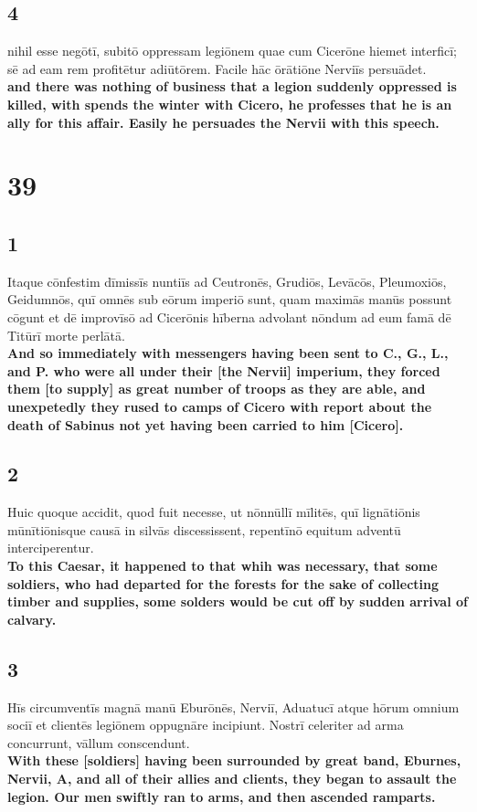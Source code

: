 \documentclass{article}
\begin{document}
\subsection*{4}
nihil esse negōtī, subitō oppressam legiōnem quae cum Cicerōne hiemet interficī; sē ad eam rem profitētur adiūtōrem. Facile hāc ōrātiōne Nerviīs persuādet.\\
\textbf{and there was nothing of business that a legion suddenly oppressed is killed, with spends the winter with Cicero, he professes that he is an ally for this affair. Easily he persuades the Nervii with this speech.}




\section*{39}
\subsection*{1}
Itaque cōnfestim dīmissīs nuntiīs ad Ceutronēs, Grudiōs, Levācōs, Pleumoxiōs, Geidumnōs, quī omnēs sub eōrum imperiō sunt, quam maximās manūs possunt cōgunt et dē improvīsō ad Cicerōnis hīberna advolant nōndum ad eum famā dē Titūrī morte perlātā. \\
\textbf{And so immediately with messengers having been sent to C., G., L., and P. who were all under their [the Nervii] imperium, they forced them [to supply] as great number of troops as they are able, and unexpetedly they rused to camps of Cicero with report about the death of Sabinus not yet having been carried to him [Cicero].}

\subsection*{2}
Huic quoque accidit, quod fuit necesse, ut nōnnūllī mīlitēs, quī lignātiōnis mūnītiōnisque causā in silvās discessissent, repentīnō equitum adventū interciperentur. \\
\textbf{To this Caesar, it happened to that whih was necessary, that some soldiers, who had departed for the forests for the sake of collecting timber and supplies, some solders would be cut off by sudden arrival of calvary.}

\subsection*{3}
Hīs circumventīs magnā manū Eburōnēs, Nerviī, Aduatucī atque hōrum omnium sociī et clientēs legiōnem oppugnāre incipiunt. Nostrī celeriter ad arma concurrunt, vāllum conscendunt. \\
\textbf{With these [soldiers] having been surrounded by great band, Eburnes, Nervii, A, and all of their allies and clients, they began to assault the legion. Our men swiftly ran to arms, and then ascended ramparts.}
\end{document}
